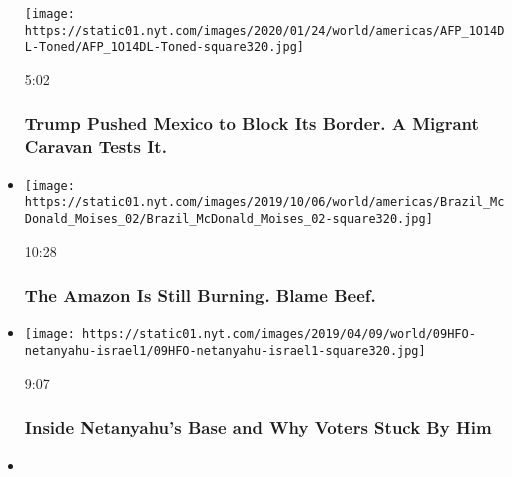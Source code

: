 \begin{itemize}
  \texttt{[image: https://static01.nyt.com/images/2020/01/24/world/americas/AFP\_1O14DL-Toned/AFP\_1O14DL-Toned-square320.jpg]}

  5:02

  \hypertarget{trump-pushed-mexico-to-block-its-border-a-migrant-caravan-tests-it}{%
  \subsubsection{Trump Pushed Mexico to Block Its Border. A Migrant
  Caravan Tests
  It.}\label{trump-pushed-mexico-to-block-its-border-a-migrant-caravan-tests-it}}
\item
  \href{https://www.nytimes.com/video/world/americas/100000006721982/amazon-rainforest-fires-burning.html?action=click\&module=video-series-bar\&region=header\&pgtype=Article\&playlistId=video/on-the-ground}{}

  \texttt{[image: https://static01.nyt.com/images/2019/10/06/world/americas/Brazil\_McDonald\_Moises\_02/Brazil\_McDonald\_Moises\_02-square320.jpg]}

  10:28

  \hypertarget{the-amazon-is-still-burning-blame-beef}{%
  \subsubsection{The Amazon Is Still Burning. Blame
  Beef.}\label{the-amazon-is-still-burning-blame-beef}}
\item
  \href{https://www.nytimes.com/video/world/middleeast/100000006431686/israel-elections-netanyahu.html?action=click\&module=video-series-bar\&region=header\&pgtype=Article\&playlistId=video/on-the-ground}{}

  \texttt{[image: https://static01.nyt.com/images/2019/04/09/world/09HFO-netanyahu-israel1/09HFO-netanyahu-israel1-square320.jpg]}

  9:07

  \hypertarget{inside-netanyahus-base-and-why-voters-stuck-by-him}{%
  \subsubsection{Inside Netanyahu's Base and Why Voters Stuck By
  Him}\label{inside-netanyahus-base-and-why-voters-stuck-by-him}}
\item
  \href{https://www.nytimes.com/video/world/asia/100000006581732/hong-kong-protesters.html?action=click\&module=video-series-bar\&region=header\&pgtype=Article\&playlistId=video/on-the-ground}{}


\end{itemize}
